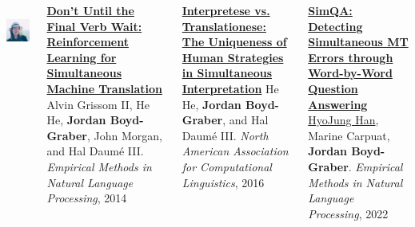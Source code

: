 \documentclass[compress]{beamer}
\begin{document}
\begin{frame}{}
\begin{columns}
\begin{center}
        \\
        \includegraphics[width=0.8\linewidth]{general_figures/hyojung}
        \end{center}

        \begin{block}{ {\bf
              \href{http://umiacs.umd.edu/~jbg//docs/2014_emnlp_simtrans.pdf}{Don’t Until the Final Verb Wait: Reinforcement Learning for Simultaneous Machine Translation}}}
          \small
Alvin Grissom II, He He, {\bf Jordan Boyd-Graber}, John Morgan, and Hal {Daum\'{e} III}.  \emph{Empirical Methods in Natural Language Processing}, 2014
        \end{block}

        \begin{block}{ {\bf
              \href{http://umiacs.umd.edu/~jbg/docs/2016_naacl_interpretese.pdf}{Interpretese
                vs. Translationese: The Uniqueness of Human Strategies
                in Simultaneous Interpretation}}}
          \small
He He, {\bf Jordan Boyd-Graber}, and Hal {Daum\'{e} III}.
\emph{North American Association for Computational Linguistics}, 2016
        \end{block}


        \begin{block}{ {\bf
              \href{http://umiacs.umd.edu/~jbg/docs/2022_emnlp_simint.pdf}{SimQA:
                Detecting Simultaneous MT Errors through 
                Word-by-Word Question Answering}}}
          \small
          \href{https://h-j-han.github.io/}{HyoJung Han}, Marine
            Carpuat, {\bf Jordan Boyd-Graber}.  \emph{Empirical Methods in Natural Language Processing}, 2022
          
          \end{block}
  \end{columns}


\end{frame}
\end{document}
